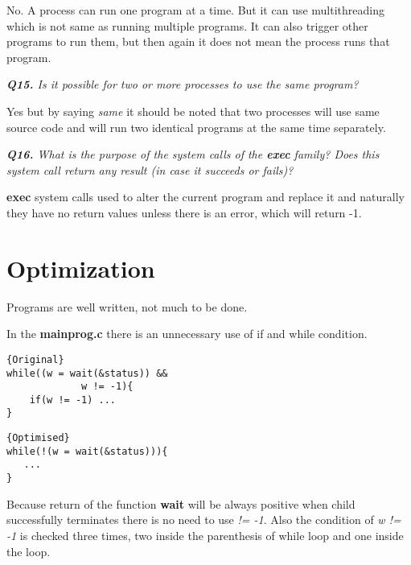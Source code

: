 \documentclass[11pt]{article}
\begin{document}
No. A process can run one program at a time. But it can use multithreading which is not same as running multiple programs. It can also trigger other programs to run them, but then again it does not mean the process runs that program.

\newpage

\vspace{5mm}
\textit{\textbf{Q15.} Is it possible for two or more processes to use the same program?}
\vspace{5mm}

Yes but by saying \textit{same} it should be noted that two processes will use same source code and will run two identical programs at the same time separately.

\vspace{5mm}
\textit{\textbf{Q16.} What is the purpose of the system calls of the \textbf{exec} family? Does this system call return any result (in case it succeeds or fails)?}
\vspace{5mm}

\textbf{exec} system calls used to alter the current program and replace it and naturally they have no return values unless there is an error, which will return -1.

\section*{Optimization}

Programs are well written, not much to be done.
\vspace{5mm}

In the \textbf{mainprog.c} there is an unnecessary use of if and while condition.

\noindent\begin{minipage}{.45\textwidth}
\begin{lstlisting}[caption=Original,frame=tlrb]{Original}
while((w = wait(&status)) &&
	         w != -1){
	if(w != -1) ...
}
\end{lstlisting}
\end{minipage}\hfill
\begin{minipage}{.50\textwidth}
\begin{lstlisting}[caption=Optimised,frame=tlrb]{Optimised}
while(!(w = wait(&status))){
   ...
}
\end{lstlisting}
\end{minipage}

Because return of the function \textbf{wait} will be always positive when child successfully terminates there is no need to use \textit{!= -1}.  Also the condition of \textit{w != -1} is checked three times, two inside the parenthesis of while loop and one inside the loop.
\end{document}
